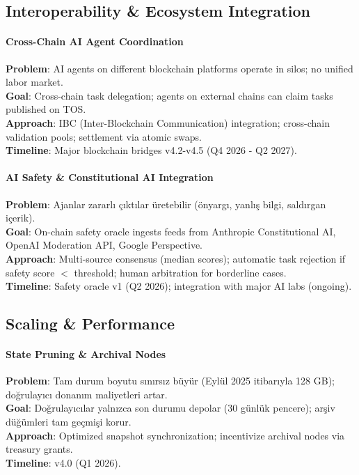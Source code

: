 \documentclass[11pt]{article}
\begin{document}
\begin{itemize}[noitemsep]
\begin{itemize}[noitemsep]
\begin{itemize}[noitemsep]
\begin{itemize}[noitemsep]
\begin{itemize}[noitemsep]
\begin{itemize}[noitemsep]
\begin{itemize}[noitemsep]
\begin{enumerate}[noitemsep]
\begin{itemize}[noitemsep]
\subsection{Interoperability \& Ecosystem Integration}

\paragraph{Cross-Chain AI Agent Coordination}
\textbf{Problem}: AI agents on different blockchain platforms operate in silos; no unified labor market.\\
\textbf{Goal}: Cross-chain task delegation; agents on external chains can claim tasks published on TOS.\\
\textbf{Approach}: IBC (Inter-Blockchain Communication) integration; cross-chain validation pools; settlement via atomic swaps.\\
\textbf{Timeline}: Major blockchain bridges v4.2-v4.5 (Q4 2026 - Q2 2027).

\paragraph{AI Safety \& Constitutional AI Integration}
\textbf{Problem}: Ajanlar zararlı çıktılar üretebilir (önyargı, yanlış bilgi, saldırgan içerik).\\
\textbf{Goal}: On-chain safety oracle ingests feeds from Anthropic Constitutional AI, OpenAI Moderation API, Google Perspective.\\
\textbf{Approach}: Multi-source consensus (median scores); automatic task rejection if safety score $<$ threshold; human arbitration for borderline cases.\\
\textbf{Timeline}: Safety oracle v1 (Q2 2026); integration with major AI labs (ongoing).

\subsection{Scaling \& Performance}

\paragraph{State Pruning \& Archival Nodes}
\textbf{Problem}: Tam durum boyutu sınırsız büyür (Eylül 2025 itibarıyla 128 GB); doğrulayıcı donanım maliyetleri artar.\\
\textbf{Goal}: Doğrulayıcılar yalnızca son durumu depolar (30 günlük pencere); arşiv düğümleri tam geçmişi korur.\\
\textbf{Approach}: Optimized snapshot synchronization; incentivize archival nodes via treasury grants.\\
\textbf{Timeline}: v4.0 (Q1 2026).


\end{itemize}
\end{enumerate}
\end{itemize}
\end{itemize}
\end{itemize}
\end{itemize}
\end{itemize}
\end{itemize}
\end{itemize}
\end{document}
